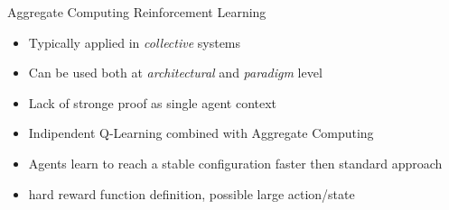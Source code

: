 \begin{frame}{Aggregate Computing \faPlus[left] Reinforcement Learning}
  \begin{cardTiny}
    \begin{itemize}
      \item Typically applied in \textit{collective} systems
      \item Can be used both at \textit{architectural} and \textit{paradigm} level
      \item [\failure{\faThumbsDown}] Lack of stronge proof as single agent context
    \end{itemize}
  \end{cardTiny}
  \begin{card}
    \begin{itemize}  
      \item Indipendent Q-Learning combined with Aggregate Computing
      \item Agents learn to reach a stable configuration faster then standard approach
      \item[\failure{\faThumbsDown}] hard reward function definition, possible large action/state
    \end{itemize}
  \end{card}
\end{frame}
